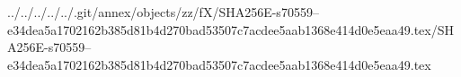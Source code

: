 ../../../../../.git/annex/objects/zz/fX/SHA256E-s70559--e34dea5a1702162b385d81b4d270bad53507c7acdee5aab1368e414d0e5eaa49.tex/SHA256E-s70559--e34dea5a1702162b385d81b4d270bad53507c7acdee5aab1368e414d0e5eaa49.tex